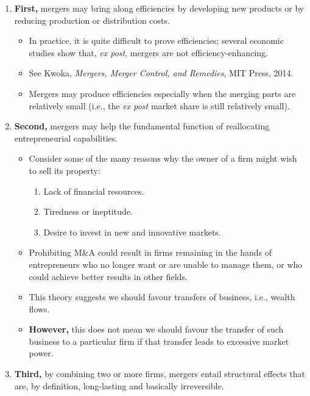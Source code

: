         \begin{enumerate}
            \item \textbf{First,} mergers may bring along efficiencies by developing new products or by reducing production or distribution costs.
            \begin{itemize}
                \item In practice, it is quite difficult to prove efficiencies; several economic studies show that, \textit{ex post}, mergers are not efficiency-enhancing. 
                \item See Kwoka, \textit{Mergers, Merger Control, and Remedies}, MIT Press, 2014.
                \item Mergers may produce efficiencies especially when the merging parts are relatively small (i.e., the \textit{ex post} market share is still relatively small).
            \end{itemize}
            \item \textbf{Second,} mergers may help the fundamental function of reallocating entrepreneurial capabilities. 
            \begin{itemize}
                \item Consider some of the many reasons why the owner of a firm might wish to sell its property:
                \begin{enumerate}[label=(\alph*)]
                    \item Lack of financial resources.
                    \item Tiredness or ineptitude.
                    \item Desire to invest in new and innovative markets.
                \end{enumerate}
                \item Prohibiting M\&A could result in firms remaining in the hands of entrepreneurs who no longer want or are unable to manage them, or who could achieve better results in other fields.
                \item This theory suggests we should favour transfers of business, i.e., wealth flows.
                \item \textbf{However,} this does not mean we should favour the transfer of such business to a particular firm if that transfer leads to excessive market power.
            \end{itemize}
            \item \textbf{Third,} by combining two or more firms, mergers entail structural effects that are, by definition, long-lasting and basically irreversible.

\end{enumerate}
